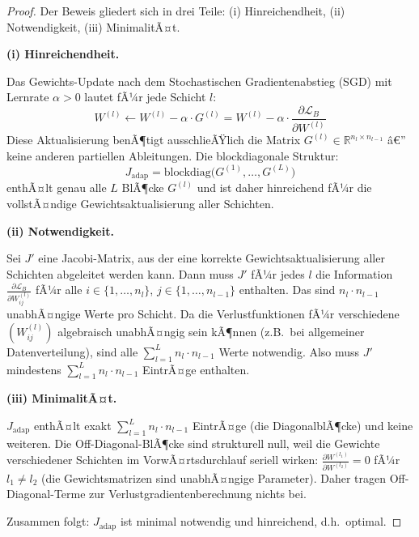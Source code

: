 ﻿\documentclass[a4paper,12pt]{article}
\theoremstyle{definition}
\begin{document}
\begin{proof}
	Der Beweis gliedert sich in drei Teile: (i) Hinreichendheit, (ii) Notwendigkeit, (iii) MinimalitÃ¤t.
	
	\medskip
	\textbf{(i) Hinreichendheit.}
	
	Das Gewichts-Update nach dem Stochastischen Gradientenabstieg (SGD) mit Lernrate $\alpha > 0$ lautet fÃ¼r jede Schicht $l$:
	\[
	W^{(l)} \leftarrow W^{(l)} - \alpha \cdot G^{(l)} = W^{(l)} - \alpha \cdot \frac{\partial \mathcal{L}_B}{\partial W^{(l)}}
	\]
	Diese Aktualisierung benÃ¶tigt ausschlieÃŸlich die Matrix $G^{(l)} \in \mathbb{R}^{n_l \times n_{l-1}}$ â€” keine anderen partiellen Ableitungen. Die blockdiagonale Struktur:
	\[
	J_{\mathrm{adap}} = \mathrm{blockdiag}\bigl(G^{(1)}, \ldots, G^{(L)}\bigr)
	\]
	enthÃ¤lt genau alle $L$ BlÃ¶cke $G^{(l)}$ und ist daher hinreichend fÃ¼r die vollstÃ¤ndige Gewichtsaktualisierung aller Schichten.
	
	\medskip
	\textbf{(ii) Notwendigkeit.}
	
	Sei $J'$ eine Jacobi-Matrix, aus der eine korrekte Gewichtsaktualisierung aller Schichten abgeleitet werden kann. Dann muss $J'$ fÃ¼r jedes $l$ die Information $\frac{\partial \mathcal{L}_B}{\partial W^{(l)}_{ij}}$ fÃ¼r alle $i \in \{1,\ldots,n_l\}$, $j \in \{1,\ldots,n_{l-1}\}$ enthalten. Das sind $n_l \cdot n_{l-1}$ unabhÃ¤ngige Werte pro Schicht. Da die Verlustfunktionen fÃ¼r verschiedene $(W^{(l)}_{ij})$ algebraisch unabhÃ¤ngig sein kÃ¶nnen (z.B.\ bei allgemeiner Datenverteilung), sind alle $\sum_{l=1}^L n_l \cdot n_{l-1}$ Werte notwendig. Also muss $J'$ mindestens $\sum_{l=1}^L n_l \cdot n_{l-1}$ EintrÃ¤ge enthalten.
	
	\medskip
	\textbf{(iii) MinimalitÃ¤t.}
	
	$J_{\mathrm{adap}}$ enthÃ¤lt exakt $\sum_{l=1}^L n_l \cdot n_{l-1}$ EintrÃ¤ge (die DiagonalblÃ¶cke) und keine weiteren. Die Off-Diagonal-BlÃ¶cke sind strukturell null, weil die Gewichte verschiedener Schichten im VorwÃ¤rtsdurchlauf seriell wirken: $\frac{\partial W^{(l_1)}}{\partial W^{(l_2)}} = 0$ fÃ¼r $l_1 \neq l_2$ (die Gewichtsmatrizen sind unabhÃ¤ngige Parameter). Daher tragen Off-Diagonal-Terme zur Verlustgradientenberechnung nichts bei.
	
	Zusammen folgt: $J_{\mathrm{adap}}$ ist minimal notwendig und hinreichend, d.h.\ optimal.
\end{proof}
\end{document}
